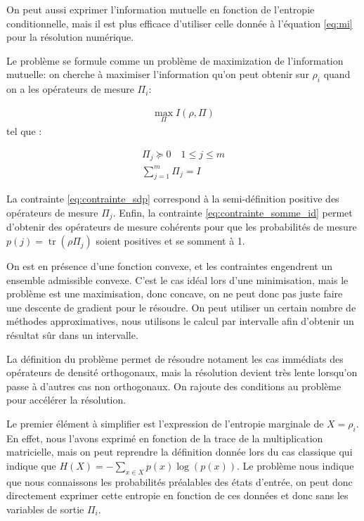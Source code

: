 \documentclass[12pt,a4paper]{article}
\DeclareMathOperator{\tr}{tr}
\begin{document}
    On peut aussi exprimer l'information mutuelle en fonction de l'entropie conditionnelle, mais il est plus efficace d'utiliser celle donnée à l'équation \ref{eq:mi} pour la résolution numérique.

    Le problème se formule comme un problème de maximization de l'information mutuelle: on cherche à maximiser l'information qu'on peut obtenir sur $\rho_i$ quand on a les opérateurs de mesure $\Pi_i$:

    \begin{align}
        \max\limits_{\Pi} I(\rho, \Pi)
    \end{align}
    tel que :

    \begin{align}
        \Pi_j \succeq 0 \quad 1 \leq j \leq m \label{eq:contrainte_sdp} \\
        \displaystyle \sum_{j=1}^{m} \Pi_j = I \label{eq:contrainte_somme_id}
    \end{align}

    La contrainte \ref{eq:contrainte_sdp} correspond à la semi-définition positive des opérateurs de mesure $\Pi_j$. Enfin, la contrainte \ref{eq:contrainte_somme_id} permet d'obtenir des opérateurs de mesure cohérents pour que les probabilités de mesure $p(j) = \tr (\rho \Pi_j)$ soient positives et se somment à 1.

    On est en présence d'une fonction convexe, et les contraintes engendrent un ensemble admissible convexe. C'est le cas idéal lors d'une minimisation, mais le problème est une maximisation, donc concave, on ne peut donc pas juste faire une descente de gradient pour le résoudre. On peut utiliser un certain nombre de méthodes approximatives, nous utilisons le calcul par intervalle afin d'obtenir un résultat sûr dans un intervalle.

    \medbreak

    La définition du problème permet de résoudre notament les cas immédiats des opérateurs de densité orthogonaux, mais la résolution devient très lente lorsqu'on passe à d'autres cas non orthogonaux. On rajoute des conditions au problème pour accélérer la résolution.
    
    Le premier élément à simplifier est l'expression de l'entropie marginale de $X=\rho_i$. En effet, nous l'avons exprimé en fonction de la trace de la multiplication matricielle, mais on peut reprendre la définition donnée lors du cas classique qui indique que $ H(X) = -\displaystyle \sum_{x \in X} p(x) \log(p(x))$. Le problème nous indique que nous connaissons les probabilités préalables des états d'entrée, on peut donc directement exprimer cette entropie en fonction de ces données et donc sans les variables de sortie $\Pi_i$.
\end{document}
